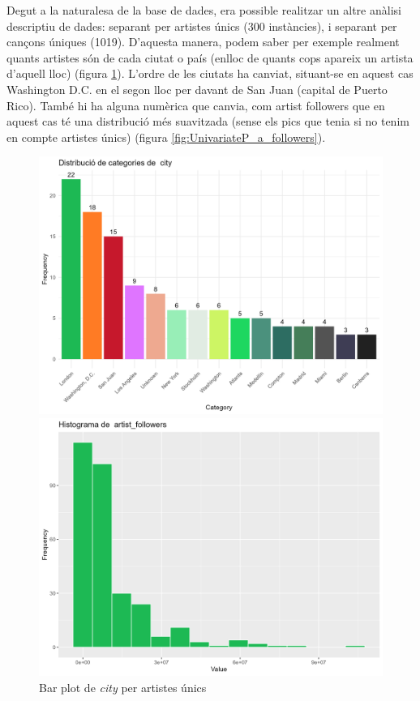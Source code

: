 Degut a la naturalesa de la base de dades, era possible realitzar un altre anàlisi descriptiu de dades: separant per artistes únics (300 instàncies), i separant per cançons úniques (1019). D'aquesta manera, podem saber per exemple realment quants artistes són de cada ciutat o país (enlloc de quants cops apareix un artista d'aquell lloc) (figura \ref{fig:UnivariateP_a_city}). L'ordre de les ciutats ha canviat, situant-se en aquest cas Washington D.C. en el segon lloc per davant de San Juan (capital de Puerto Rico). També hi ha alguna numèrica que canvia, com artist followers que en aquest cas té una distribució més suavitzada (sense els pics que tenia si no tenim en compte artistes únics) (figura \ref{fig:UnivariateP_a_followers}).

\begin{figure}[H]
\centering
    \begin{minipage}{.4\textwidth}
        \centering
        \includegraphics[width=0.95\linewidth]{Images/3_Preprocessing/Artist/bar_city.png}
        \caption{Bar plot de \textit{city} per artistes únics}
        \label{fig:UnivariateP_a_city}
    \end{minipage}%
    \begin{minipage}{.4\textwidth}
        \centering
        \includegraphics[width=0.95\linewidth]{Images/3_Preprocessing/Artist/hist_artist_followers.png}

\end{minipage}
\end{figure}
